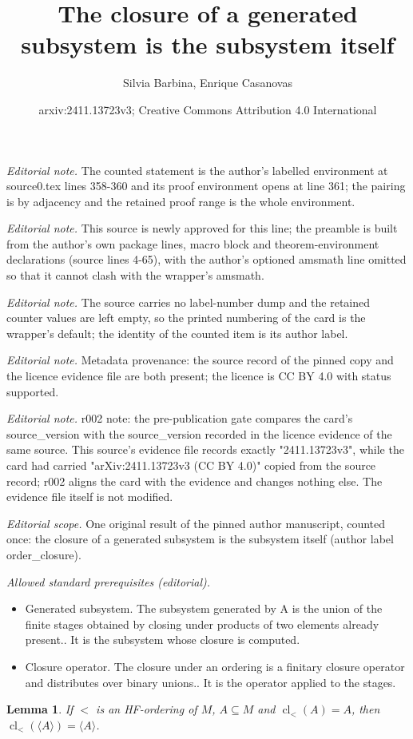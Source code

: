 \documentclass[10pt,a4paper]{article}
\title{The closure of a generated subsystem is the subsystem itself}
\author{Silvia Barbina, Enrique Casanovas}
\date{arxiv:2411.13723v3; Creative Commons Attribution 4.0 International}
\DeclareMathOperator{\cl}{cl}
\theoremstyle{note}
\newtheorem{lemma}[thm]{Lemma}
\begin{document}
\maketitle
\noindent\textit{Editorial note.} The counted statement is the author's labelled environment at source0.tex lines 358-360 and its proof environment opens at line 361; the pairing is by adjacency and the retained proof range is the whole environment.\par\medskip
\noindent\textit{Editorial note.} This source is newly approved for this line; the preamble is built from the author's own package lines, macro block and theorem-environment declarations (source lines 4-65), with the author's optioned amsmath line omitted so that it cannot clash with the wrapper's amsmath.\par\medskip
\noindent\textit{Editorial note.} The source carries no label-number dump and the retained counter values are left empty, so the printed numbering of the card is the wrapper's default; the identity of the counted item is its author label.\par\medskip
\noindent\textit{Editorial note.} Metadata provenance: the source record of the pinned copy and the licence evidence file are both present; the licence is CC BY 4.0 with status supported.\par\medskip
\noindent\textit{Editorial note.} r002 note: the pre-publication gate compares the card's source\_version with the source\_version recorded in the licence evidence of the same source. This source's evidence file records exactly "2411.13723v3", while the card had carried "arXiv:2411.13723v3 (CC BY 4.0)" copied from the source record; r002 aligns the card with the evidence and changes nothing else. The evidence file itself is not modified.\par\medskip
\noindent\textit{Editorial scope.} One original result of the pinned author manuscript, counted once: the closure of a generated subsystem is the subsystem itself (author label order\_closure).\par\medskip
\noindent\textit{Allowed standard prerequisites (editorial).}\begin{itemize}
\item Generated subsystem. The subsystem generated by A is the union of the finite stages obtained by closing under products of two elements already present.. It is the subsystem whose closure is computed.
\item Closure operator. The closure under an ordering is a finitary closure operator and distributes over binary unions.. It is the operator applied to the stages.
\end{itemize}\medskip
\begin{lemma}\label{order_closure}
	If $<$ is an HF-ordering of $M$,  $A\subseteq M$  and $\cl_<(A)=A$, then  $\cl_<(\langle A\rangle )= \langle A \rangle$.
\end{lemma}
\end{document}
